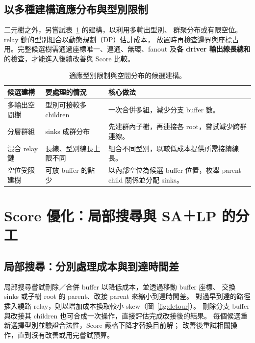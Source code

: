 \documentclass[12pt,a4paper]{article}
\begin{document}
\subsection{以多種建構適應分布與型別限制}
二元樹之外，另嘗試表~\ref{tab:construction} 的建構，以利用多輸出型別、
群聚分布或有限空位。relay 鏈的型別組合以動態規劃（DP）估計成本，
放置時再檢查邊界與座標占用。完整候選樹需通過座標唯一、連通、無環、fanout
及\textbf{各 driver 輸出線長總和}的檢查，才能進入後續改善與 Score 比較。

\begin{table}[htbp]
\centering
\begin{tabular}{@{}p{31mm}p{42mm}p{94mm}@{}}
\toprule
候選建構 & 要處理的情況 & 核心做法\\
\midrule
多輸出空間樹 & 型別可接較多 children & 一次合併多組，減少分支 buffer 數。\\
分層群組 & sinks 成群分布 & 先建群內子樹，再連接各 root，嘗試減少跨群連線。\\
混合 relay 鏈 & 長線、型別線長上限不同 & 組合不同型別，以較低成本提供所需接續線長。\\
空位受限建樹 & 可放 buffer 的點少 & 以內部空位為候選 buffer 位置，枚舉 parent-child 關係並分配 sinks。\\
\bottomrule
\end{tabular}
\caption{適應型別限制與空間分布的候選建構。}
\label{tab:construction}
\end{table}

\clearpage
\section{Score 優化：局部搜尋與 SA＋LP 的分工}
\subsection{局部搜尋：分別處理成本與到達時間差}
局部搜尋嘗試刪除／合併 buffer 以降低成本，並透過移動 buffer 座標、
交換 sinks 或子樹 root 的 parent、改接 parent 來縮小到達時間差。
對過早到達的路徑插入繞路 relay，則以增加成本換取較小 skew（圖~\ref{fig:detour}）。
刪除分支 buffer 與改接其 children 也可合成一次操作，直接評估完成改接後的結果。
每個候選重新選擇型別並驗證合法性，Score 嚴格下降才替換目前解；
改善後重試相關操作，直到沒有改善或用完嘗試預算。
\end{document}

